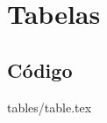 \section{Tabelas} %
\label{sec:tabelas}

\subsection*{Código} %
\label{sub:c_digo}



\begin{frame}


 {tables/table.tex}

\end{frame}
